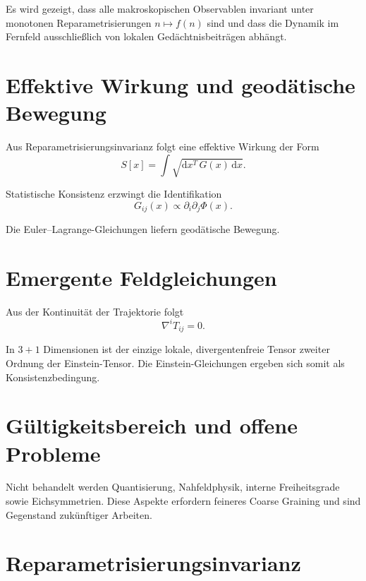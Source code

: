 \documentclass[11pt,a4paper]{article}
\renewcommand{\dd}{\mathrm{d}}
\begin{document}
Es wird gezeigt, dass alle makroskopischen Observablen invariant unter monotonen Reparametrisierungen $n \mapsto f(n)$ sind und dass die Dynamik im Fernfeld ausschließlich von lokalen Gedächtnisbeiträgen abhängt.

\section{Effektive Wirkung und geod\"atische Bewegung}

Aus Reparametrisierungsinvarianz folgt eine effektive Wirkung der Form
\begin{equation}
 S[x] = \int \sqrt{\dd x^T \, G(x) \, \dd x}.
\end{equation}

Statistische Konsistenz erzwingt die Identifikation
\begin{equation}
 G_{ij}(x) \propto \partial_i \partial_j \Phi(x).
\end{equation}

Die Euler--Lagrange-Gleichungen liefern geodätische Bewegung.

\section{Emergente Feldgleichungen}

Aus der Kontinuität der Trajektorie folgt
\begin{equation}
 \nabla^i T_{ij} = 0.
\end{equation}

In $3+1$ Dimensionen ist der einzige lokale, divergentenfreie Tensor zweiter Ordnung der Einstein-Tensor. Die Einstein-Gleichungen ergeben sich somit als Konsistenzbedingung.

\section{G\"ultigkeitsbereich und offene Probleme}

Nicht behandelt werden Quantisierung, Nahfeldphysik, interne Freiheitsgrade sowie Eichsymmetrien. Diese Aspekte erfordern feineres Coarse Graining und sind Gegenstand zukünftiger Arbeiten.

\appendix

\section{Reparametrisierungsinvarianz}
\end{document}
